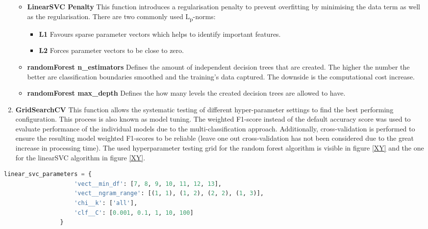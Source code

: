 \begin{enumerate}
\begin{itemize}
        \item \textbf{LinearSVC Penalty} This function introduces a regularisation penalty to prevent overfitting by minimising the data term as well as the regularisation. There are two commonly used L\textsubscript{p}-norms:
        \begin{itemize}
            \item \textbf{L1} Favours sparse parameter vectors which helps to identify important features.
            \item \textbf{L2} Forces parameter vectors to be close to zero.
        \end{itemize}
        
        \item \textbf{randomForest n\_estimators} Defines the amount of independent decision trees that are created. The higher the number the better are classification boundaries smoothed and the training's data captured. The downside is the computational cost increase.
        
        \item \textbf{randomForest max\_depth} Defines the how many levels the created decision trees are allowed to have.
        \end{itemize}
    
    \item \textbf{GridSearchCV} This function allows the systematic testing of different hyper-parameter settings to find the best performing configuration. This process is also known as model tuning. The weighted F1-score instead of the default accuracy score was used to evaluate performance of the individual models due to the multi-classification approach. Additionally, cross-validation is performed to ensure the resulting model weighted F1-scores to be reliable (leave one out cross-validation has not been considered due to the great increase in processing time). The used hyperparameter testing grid for the random forest algorithm is visible in figure \ref{XY} and the one for the linearSVC algorithm in figure \ref{XY}.
\end{enumerate}

\begin{lstlisting}[language=Python, caption=Tuned hyperparameters of the linearSVC fitting algorithm]
linear_svc_parameters = {
                    'vect__min_df': [7, 8, 9, 10, 11, 12, 13],
                    'vect__ngram_range': [(1, 1), (1, 2), (2, 2), (1, 3)],
                    'chi__k': ['all'],
                    'clf__C': [0.001, 0.1, 1, 10, 100]
                }
\end{lstlisting}

